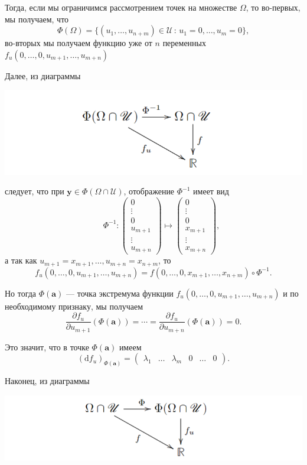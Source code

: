 \documentclass[a4paper]{article}
\newcommand{\m}[1]{\mathbf{#1}}
\begin{document}
Тогда, если мы ограничимся рассмотрением точек на множестве $\Omega$, то во-первых, мы получаем, что 
$$
\Phi(\Omega) = \{(u_1,\ldots, u_{n+m}) \in \mathscr{U}\, : \, u_1=0,\ldots, u_m=0\},
$$
во-вторых мы получаем функцию уже от $n$ переменных $f_u(0,\ldots, 0, u_{m+1},\ldots, u_{m+n})$

Далее, из диаграммы
\begin{center}
    \includegraphics[width=0.5\linewidth]{image-5.png}
\end{center}
следует, что при $\m{y} \in \Phi(\Omega \cap \mathscr{U})$, отображение $\Phi^{-1}$ имеет вид
$$
\qquad \Phi^{-1} : \begin{pmatrix}
0\\
\vdots \\
0\\
u_{m+1} \\
\vdots \\
u_{m+n}
\end{pmatrix} \mapsto \begin{pmatrix}
0\\
\vdots \\
0\\
x_{m+1} \\
\vdots \\
x_{m+n}
\end{pmatrix},
$$
а так как $u_{m+1} = x_{m+1}, \ldots, u_{m+n} =x_{n+m}$, то
$$
f_u(0,\ldots, 0, u_{m+1},\ldots, u_{m+n}) = f(0,\ldots, 0, x_{m+1}, \ldots, x_{n+m}) \circ \Phi^{-1}.
$$

Но тогда $\Phi(\m{a})$ — точка экстремума функции $f_u(0,\ldots, 0, u_{m+1},\ldots, u_{m+n})$ и по необходимому признаку, мы получаем
$$
\dfrac{\partial f_u}{\partial{u_{m+1}}}(\Phi(\m{a})) = \cdots = \dfrac{\partial f_u}{\partial{u_{m+n}}}(\Phi(\m{a})) = 0.
$$

Это значит, что в точке $\Phi(\m{a})$ имеем
$$
(\mathrm{d}f_u)_{\Phi(\m{a})} = \begin{pmatrix}
\lambda_1 & \ldots & \lambda_m & 0 & \ldots & 0
\end{pmatrix}.
$$

Наконец, из диаграммы

\begin{center}
    \includegraphics[width=0.5\linewidth]{image-6.png}
\end{center}
\end{document}

